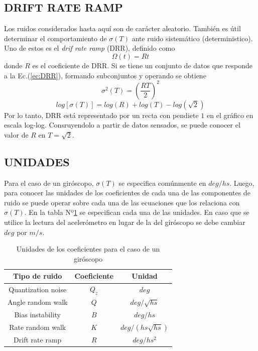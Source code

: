 \documentclass[a4paper,11pt,twoside]{IT-CNEA}
\begin{document}
\subsection{DRIFT RATE RAMP}
Los ruidos considerados hasta aquí son de carácter aleatorio. También es útil determinar el comportamiento de $\sigma(T)$ ante ruido sistemático (deterministico). Uno de estos es el \textit{drif rate ramp} (DRR), definido como
\begin{equation}
\Omega(t)=Rt
\label{ec:DRR}
\end{equation}
donde $R$ es el coeficiente de DRR. Si se tiene un conjunto de datos que responde a la Ec.(\ref{ec:DRR}), formando subconjuntos y operando se obtiene
\begin{equation}
\sigma^2(T)=\left( \frac{RT}{2}\right)^2
\label{ec:AVDDR}
\end{equation}
\begin{equation}
log\left[ \sigma(T)\right]=log(R)+log(T)-log\left( \sqrt{2}\right)
\end{equation}
Por lo tanto, DRR está representado por un recta con pendiete $1$ en el gráfico en escala log-log. Consruyendolo a partir de datos sensados, se puede conocer el valor de $R$ en $T=\sqrt{2}$.
\subsection{UNIDADES}
Para el caso de un giróscopo, $\sigma(T)$ se especifica comúnmente en $deg/hs$. Luego, para conocer las unidades de los coeficientes de cada una de las componentes de ruido se puede operar sobre cada una de las ecuaciones que los relaciona con $\sigma(T)$. En la tabla Nº\ref{tabla:unidadesCoeficientes} se especifican cada una de las unidades. En caso que se utilice la lectura del acelerómetro en lugar de la del giróscopo se debe cambiar $deg$ por $m/s$.
\begin{table}[h!]
\centering
\caption{Unidades de los coeficientes para el caso de un giróscopo}
\label{tabla:unidadesCoeficientes}
\begin{tabular}{|c|c|c|}
\hline
Tipo de ruido&Coeficiente& Unidad \\ \hline
Quantization noise&$Q_z$&$deg$ \\ \hline
Angle random walk&$Q$&$deg/\sqrt{hs}$ \\ \hline
Bias instability&$B$&$deg/hs$ \\ \hline
Rate random walk&$K$&$deg/\left( hs\sqrt{hs}\right)$ \\ \hline
Drift rate ramp&$R$&$deg/hs^2$ \\ \hline
\end{tabular}
\end{table}
\end{document}
